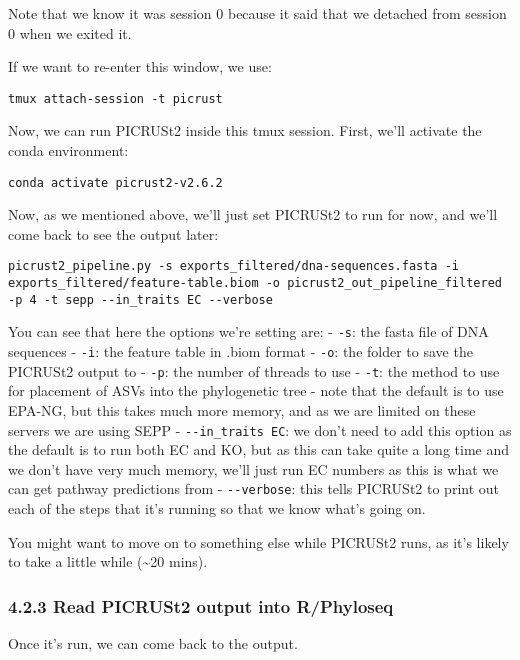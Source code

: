 \documentclass[
]{book}
\begin{document}
Note that we know it was session 0 because it said that we detached from session 0 when we exited it.

If we want to re-enter this window, we use:

\begin{verbatim}
tmux attach-session -t picrust
\end{verbatim}

Now, we can run PICRUSt2 inside this tmux session. First, we'll activate the conda environment:

\begin{verbatim}
conda activate picrust2-v2.6.2
\end{verbatim}

Now, as we mentioned above, we'll just set PICRUSt2 to run for now, and we'll come back to see the output later:

\begin{verbatim}
picrust2_pipeline.py -s exports_filtered/dna-sequences.fasta -i exports_filtered/feature-table.biom -o picrust2_out_pipeline_filtered -p 4 -t sepp --in_traits EC --verbose
\end{verbatim}

You can see that here the options we're setting are:
- \texttt{-s}: the fasta file of DNA sequences
- \texttt{-i}: the feature table in .biom format
- \texttt{-o}: the folder to save the PICRUSt2 output to
- \texttt{-p}: the number of threads to use
- \texttt{-t}: the method to use for placement of ASVs into the phylogenetic tree - note that the default is to use EPA-NG, but this takes much more memory, and as we are limited on these servers we are using SEPP
- \texttt{-\/-in\_traits\ EC}: we don't need to add this option as the default is to run both EC and KO, but as this can take quite a long time and we don't have very much memory, we'll just run EC numbers as this is what we can get pathway predictions from
- \texttt{-\/-verbose}: this tells PICRUSt2 to print out each of the steps that it's running so that we know what's going on.

You might want to move on to something else while PICRUSt2 runs, as it's likely to take a little while (\textasciitilde20 mins).

\subsubsection{4.2.3 Read PICRUSt2 output into R/Phyloseq}\label{read-picrust2-output-into-rphyloseq}

Once it's run, we can come back to the output.
\end{document}
